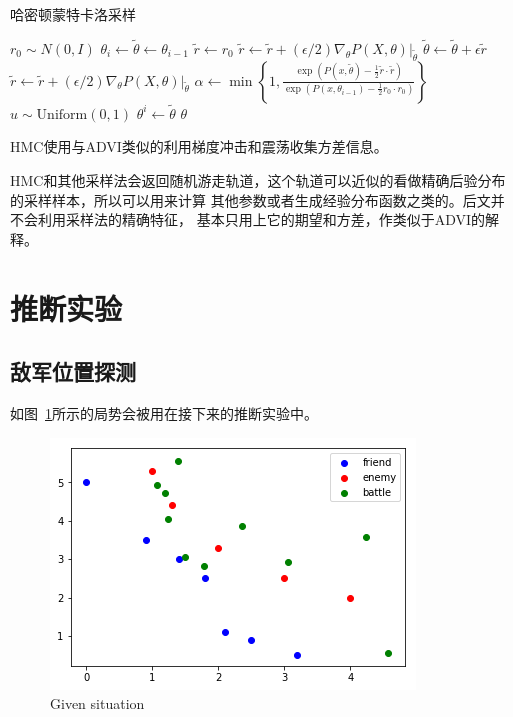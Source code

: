 \documentclass{sicnuthesis}
\begin{document}
\begin{algorithm}
\caption{哈密顿蒙特卡洛采样}
\begin{algorithmic}[1]
 
        \State $r_0 \sim N(0,I)$
        \State $\theta_i \gets \tilde{\theta} \gets \theta_{i-1}$
        \State $\tilde{r} \gets r_0$
         
            \State $\tilde{r} \gets \tilde{r} + (\epsilon/2) \nabla_\theta P(X,\theta)|_{\tilde{\theta}}$
            \State $\tilde{\theta} \gets \tilde{\theta} + \epsilon \tilde{r}$
            \State $\tilde{r} \gets \tilde{r} + (\epsilon/2) \nabla_\theta P(X,\theta)|_{\tilde{\theta}}$
        \EndFor
        \State $\alpha \gets \min \left\{ 1, \frac{\exp(P(x,\tilde{\theta})-\frac{1}{2}\tilde{r}\cdot\tilde{r})}{\exp(P(x,\theta_{i-1})-\frac{1}{2}r_0\cdot r_0)} \right\}$  
        \State $u \sim \mathrm{Uniform}(0,1)$
            \State $\theta^i \gets \tilde{\theta}$
        \EndIf
    \EndFor
    \State \Return $\theta$
\EndProcedure
\end{algorithmic}
\label{alg:hmc}
\end{algorithm}


HMC使用与ADVI类似的利用梯度冲击和震荡收集方差信息。

HMC和其他采样法会返回随机游走轨道，这个轨道可以近似的看做精确后验分布的采样样本，所以可以用来计算
其他参数或者生成经验分布函数之类的。后文并不会利用采样法的精确特征，
基本只用上它的期望和方差，作类似于ADVI的解释。

\clearpage
\section{推断实验}

\subsection{敌军位置探测}


如图~\ref{fig:expState}所示的局势会被用在接下来的推断实验中。

\begin{figure}[htb]
\includegraphics[width=0.6\linewidth]{exp_state.png}
\caption{Given situation}
\label{fig:expState}
\end{figure}
\end{document}

